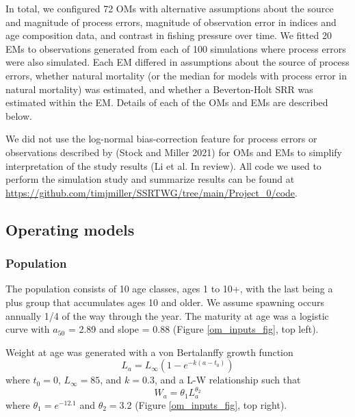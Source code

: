 \documentclass[
  12pt,
]{article}
\begin{document}
In total, we configured 72 OMs with alternative assumptions about the
source and magnitude of process errors, magnitude of observation error
in indices and age composition data, and contrast in fishing pressure
over time. We fitted 20 EMs to observations generated from each of 100
simulations where process errors were also simulated. Each EM differed
in assumptions about the source of process errors, whether natural
mortality (or the median for models with process error in natural
mortality) was estimated, and whether a Beverton-Holt SRR was estimated
within the EM. Details of each of the OMs and EMs are described below.

We did not use the log-normal bias-correction feature for process errors
or observations described by (Stock and Miller 2021) for OMs and EMs to
simplify interpretation of the study results (Li et al. In review). All
code we used to perform the simulation study and summarize results can
be found at
\url{https://github.com/timjmiller/SSRTWG/tree/main/Project_0/code}.

\subsection*{Operating models}\label{operating-models}

\subsubsection*{Population}\label{population}

The population consists of 10 age classes, ages 1 to 10+, with the last
being a plus group that accumulates ages 10 and older. We assume
spawning occurs annually 1/4 of the way through the year. The maturity
at age was a logistic curve with \(a_{50}\) = 2.89 and slope = 0.88
(Figure \ref{om_inputs_fig}, top left).

Weight at age was generated with a von Bertalanffy growth function \[
L_a = L_{\infty}\left(1 - e^{-k(a - t_0)}\right)
\] where \(t_0 = 0\), \(L_\infty = 85\), and \(k = 0.3\), and a L-W
relationship such that \[
W_a = \theta_1 L_a^{\theta_2}
\] where \(\theta_1 = e^{-12.1}\) and \(\theta_2 = 3.2\) (Figure
\ref{om_inputs_fig}, top right).
\end{document}
